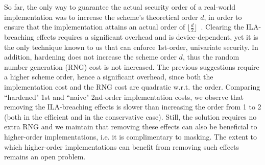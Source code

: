 So far, the only way to guarantee the actual security order of a real-world implementation was to increase the scheme's theoretical order $d$, in order to ensure that the implementation attains an actual order of $\lfloor \frac{d}{2} \rfloor$~\cite{DBLP:conf/cardis/BalaschGGRS14, DBLP:journals/iacr/GrootPPSB16}. Clearing the ILA-breaching effects requires a significant overhead and is device-dependent, yet it is the only technique known to us that can enforce 1st-order, univariate security. In addition, hardening does not increase the scheme order $d$, thus the random number generation (RNG) cost is not increased. The previous suggestions require a higher scheme order, hence a significant overhead, since both the implementation cost and the RNG cost are quadratic w.r.t. the order. Comparing ``hardened" 1st and ``naive" 2nd-order implementation costs, we observe that removing the ILA-breaching effects is slower than increasing the order from 1 to 2 (both in the efficient and in the conservative case). Still, the solution requires no extra RNG and we maintain that removing these effects can also be beneficial to higher-order implementations, i.e. it is complimentary to masking. The extent to which higher-order implementations can benefit from removing such effects remains an open problem.


















